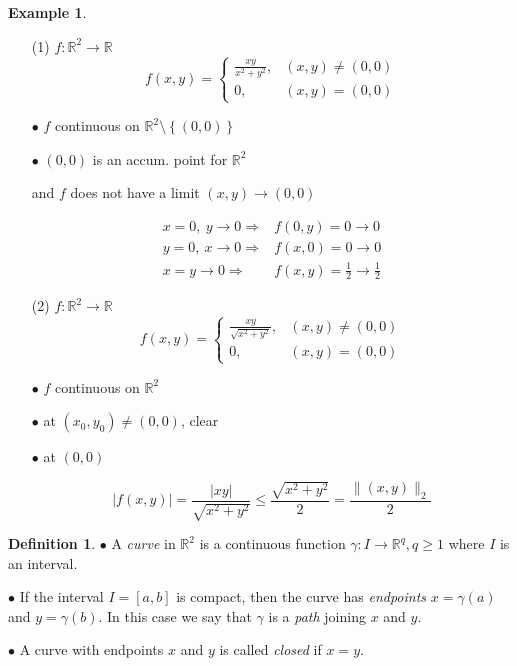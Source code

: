 \documentclass[12pt]{amsbook}
\theoremstyle{definition}
\newtheorem{definition}[theorem]{Definition}
\newtheorem{example}[theorem]{Example}
\newcommand{\RR}{{\mathbb R}}
\newcommand{\Ra}{\Rightarrow} %
\newcommand{\ra}{\rightarrow} %
\begin{document}
\begin{example}
\begin{itemize}
\item[(1)] $f: \RR^2 \ra \RR$
\begin{equation*}
f(x,y) =\left\{\begin{array}{ll} \frac{xy}{x^2+y^2}, & (x,y) \neq (0,0) \\ 0, & (x,y) = (0,0) \end{array} \right.
\end{equation*}

$\bullet$ $f$ continuous on $\RR^2 \setminus \left\{(0,0)\right\}$

$\bullet$  $(0,0)$ is an accum. point for $\RR^2$

and $f$ does not have a limit $(x,y) \ra (0,0)$

\begin{align} \nonumber
x = 0, \ y \ra 0 \Ra & f(0,y) = 0 \ra 0 \\ \nonumber
y = 0, \ x \ra 0 \Ra & f(x,0) = 0 \ra 0 \\ \nonumber
x = y \ra 0 \Ra & f(x,y) = \frac{1}{2} \ra \frac{1}{2}
\end{align}

\item[(2)] $f: \RR^2 \ra \RR$
\begin{equation*}
f(x,y) =\left\{\begin{array}{ll} \frac{xy}{\sqrt{x^2+y^2}}, & (x,y) \neq (0,0) \\ 0, & (x,y) = (0,0) \end{array} \right.
\end{equation*}

$\bullet$ $f$ continuous on $\RR^2$

$\bullet$ at $(x_0, y_0) \neq (0,0)$, clear

$\bullet$ at $(0,0)$

\begin{equation*}
|f(x,y)| = \frac{|xy|}{\sqrt{x^2+y^2}} \leq \frac{\sqrt{x^2+y^2}}{2} = \frac{\|(x,y)\|_2}{2}
\end{equation*}

\end{itemize}
\end{example}


\begin{definition}
$\bullet$ A \emph{curve} in $\RR^2$ is a continuous function $\gamma: I \ra \RR^q, q \geq 1$ where $I$ is an interval.

$\bullet$ If the interval $I = [a, b]$ is compact, then the curve has \emph{endpoints} $x = \gamma(a)$ and $y = \gamma(b)$. In this case we say that $\gamma$ is a \emph{path} joining $x$ and $y$.

$\bullet$ A curve with endpoints $x$ and $y$ is called \emph{closed} if $x = y$.
\end{definition}
\end{document}
